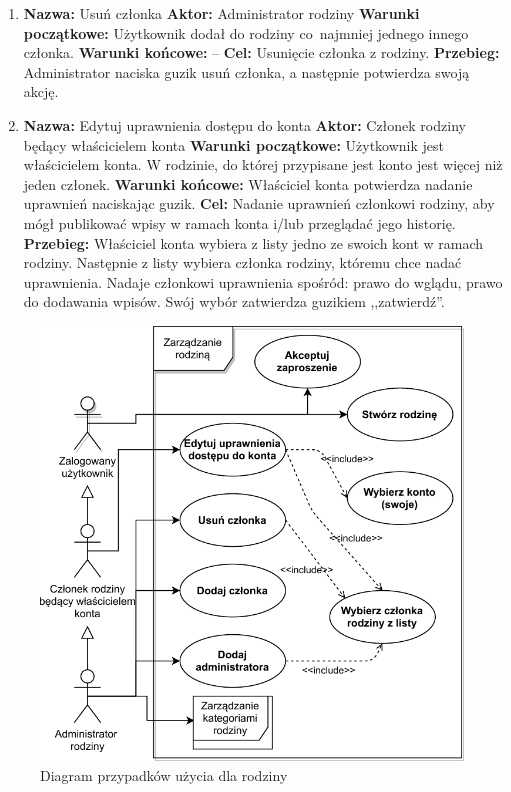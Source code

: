 \begin{enumerate}[labelwidth=1em,label=\arabic*.]
\item \textbf{Nazwa:} Usuń członka \newline
    \textbf{Aktor:} Administrator rodziny \newline
    \textbf{Warunki początkowe:} Użytkownik dodał do rodziny co~najmniej jednego innego członka. \newline
    \textbf{Warunki końcowe:} --  \newline
    \textbf{Cel:} Usunięcie członka z rodziny. \newline
    \textbf{Przebieg:} Administrator naciska guzik usuń członka, a następnie potwierdza swoją akcję.
\item \textbf{Nazwa:} Edytuj uprawnienia dostępu do konta \newline
    \textbf{Aktor:} Członek rodziny będący właścicielem konta \newline
    \textbf{Warunki początkowe:} Użytkownik jest właścicielem konta. W rodzinie, do której przypisane jest konto jest więcej niż jeden członek. \newline
    \textbf{Warunki końcowe:} Właściciel konta potwierdza nadanie uprawnień naciskając guzik. \newline
    \textbf{Cel:} Nadanie uprawnień członkowi rodziny, aby mógł publikować wpisy w ramach konta i/lub przeglądać jego historię.  \newline
    \textbf{Przebieg:} Właściciel konta wybiera z listy jedno ze swoich kont w ramach rodziny. Następnie z listy wybiera członka rodziny, któremu chce nadać uprawnienia. Nadaje członkowi uprawnienia spośród: prawo do wglądu, prawo do dodawania wpisów.
    Swój wybór zatwierdza guzikiem ,,zatwierdź''.
\end{enumerate}

\begin{figure}[t]
	\centering
	\includegraphics[width=.65\linewidth]{rys03/use-case-family-2.pdf}
	\caption{Diagram przypadków użycia dla rodziny}
	\label{fig:use-case-family}
\end{figure}

